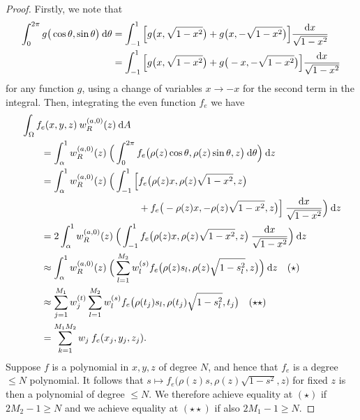 \documentclass[11pt, oneside]{article}   	%
\begin{document}
\begin{proof}
Firstly, we note that
\begin{align*}
	\int_0^{2\pi} g\big(\cos \theta, \sin\theta\big) \: {\rm d} \theta &= \int_{-1}^1 \Big[ g\big(x, \sqrt{1-x^2}\big) + g\big(x, -\sqrt{1-x^2}\big) \Big] \frac{{\rm d} x}{\sqrt{1-x^2}} \\
	&= \int_{-1}^1 \Big[ g\big(x, \sqrt{1-x^2}\big) + g\big(-x, -\sqrt{1-x^2}\big) \Big] \frac{{\rm d} x}{\sqrt{1-x^2}}
\end{align*}
for any function $g$, using a change of variables $x \to -x$ for the second term in the integral. Then, integrating the even function $f_e$ we have
\begin{align*}
	&\int_\Omega f_e(x,y,z) \: w_R^{(a,0)}(z) \: {\rm d} A \\
	&\quad \quad = \int_\alpha^1 w_R^{(a,0)}(z) \: \Big( \int_0^{2\pi} f_e\big(\rho(z)\cos\theta,\rho(z)\sin\theta, z\big) \: {\rm d} \theta \Big) \: {\rm d} z \\
	&\quad \quad = \int_\alpha^1 w_R^{(a,0)}(z) \: \Big( \int_{-1}^1 \Big[ f_e\big(\rho(z)x,\rho(z)\sqrt{1-x^2}, z\big) \\
	&\quad \quad \quad \quad \quad \quad \quad \quad \quad \quad \quad \quad + f_e\big(-\rho(z)x, - \rho(z)\sqrt{1-x^2}, z\big) \Big] \: \frac{{\rm d} x}{\sqrt{1-x^2}} \Big) \: {\rm d} z \\
	&\quad \quad = 2 \int_\alpha^1 w_R^{(a,0)}(z) \: \Big( \int_{-1}^1 f_e\big(\rho(z)x,\rho(z)\sqrt{1-x^2}, z\big) \: \frac{{\rm d} x}{\sqrt{1-x^2}} \Big) \: {\rm d} z \\
	&\quad \quad \approx \int_\alpha^1 w_R^{(a,0)}(z) \: \Big( \sum_{l=1}^{M_2} w_l^{(s)} f_e\big(\rho(z) s_l, \rho(z) \sqrt{1 - s_l^2}, z\big) \Big) \: {\rm d} z \quad (\star) \\
	&\quad \quad \approx \sum_{j=1}^{M_1} w_j^{(t)} \sum_{l=1}^{M_2} w_l^{(s)} f_e\big(\rho(t_j) s_l, \rho(t_j) \sqrt{1 - s_l^2}, t_j\big) \quad (\star \star) \\
	&\quad \quad = \sum_{k=1}^{M_1 M_2}  w_j \: f_e(x_j, y_j, z_j).
\end{align*}
Suppose $f$ is a polynomial in $x,y,z$ of degree $N$, and hence that $f_e$ is a degree $\le N$ polynomial. It follows that $s \mapsto f_e\big(\rho(z)s,\rho(z)\sqrt{1-s^2}, z\big)$ for fixed $z$ is then a polynomial of degree $\le N$. We therefore achieve equality at $(\star)$ if $2M_2 - 1 \ge N$ and we achieve equality at $(\star \star)$ if also $2M_1 - 1 \ge N$.


\end{proof}
\end{document}
